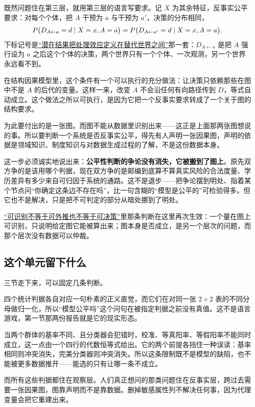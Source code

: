 既然问题住在第三层，就用第三层的语言写要求。记 \(X\) 为其余特征，反事实公平要求：对每个个体，把 \(A\) 干预为 \(a\) 与干预为 \(a'\)，决策的分布相同，
\[
P\bigl(D_{A\leftarrow a}=d\mid X=x,A=a\bigr)
=P\bigl(D_{A\leftarrow a'}=d\mid X=x,A=a\bigr).
\]
下标记号是\hyperref[sec:13-Machine-Learning/12-Causal-Inference/04]{``潜在结果把处理效应定义在替代世界之间''}那一套：\(D_{A\leftarrow a}\) 是把 \(A\) 强行设为 \(a\) 之后这个个体的决策，两个世界只有一个个体、一次观测，另一个世界永远看不到。

在结构因果模型里，这个条件有一个可以执行的充分做法：让决策只依赖那些在图中不是 \(A\) 的后代的变量。这样一来，改变 \(A\) 不会沿任何有向路径传到 \(D\)，等式自动成立。这个做法之所以可执行，是因为它把一个反事实要求转成了一个关于图的结构要求。

为此要付出的是一张图。而图不能从数据里识别出来——这正是上面那两张图想说的事。所以要判断一个系统是否反事实公平，得先有人声明一张因果图，声明的依据是领域知识、制度知识与对数据生成过程的了解，不是这份数据本身。

这一步必须诚实地说出来：\textbf{公平性判断的争论没有消失，它被搬到了图上}。原先双方争的是该用哪个判据，现在双方争的是邮编到底算不算真实风险的合法度量、学历差异有多少来自可归因于系统的通路。这不是退步——把争论摆到明处、指着某个节点问``你确定这条边不存在吗''，比一句含糊的``模型是公平的''可检验得多。但它也不是解决，只是把不可判定的部分从暗处挪到了明处。

\hyperref[sec:13-Machine-Learning/12-Causal-Inference/06]{``可识别不等于可外推也不等于可决策''}里那条判断在这里再次生效：一个量在图上可识别，只说明给定图它能被算出来；图本身是否成立，是另一个层次的问题，而那个层次没有数据可以仲裁。

\subsection{这个单元留下什么}

三节走下来，可以固定几条判断。

四个统计判据各自对应一句朴素的正义直觉，而它们在对同一张 \(2\times2\) 表的不同分母做归一化，所以``模型公平吗''这个问句在被指定判据之前没有真值。这不是语言游戏，第一节那两份报告就是它的现实形态。

当两个群体的基率不同、且分类器会犯错时，校准、等真阳率、等假阳率不能同时成立，这一点由一个四行的代数恒等式给出。它的两个前提各挡住一种误读：基率相同则冲突消失，完美分类器则冲突消失。所以这条限制既不是模型的缺陷，也不能被更多数据推开——能选的只有让哪一条不成立。

而所有这些判据都住在观察层。人们真正想问的那类问题住在反事实层，跨过去需要一张因果图，图靠声明而不是靠数据。删掉敏感属性列不解决任何事，因为代理变量会把它重建出来。

